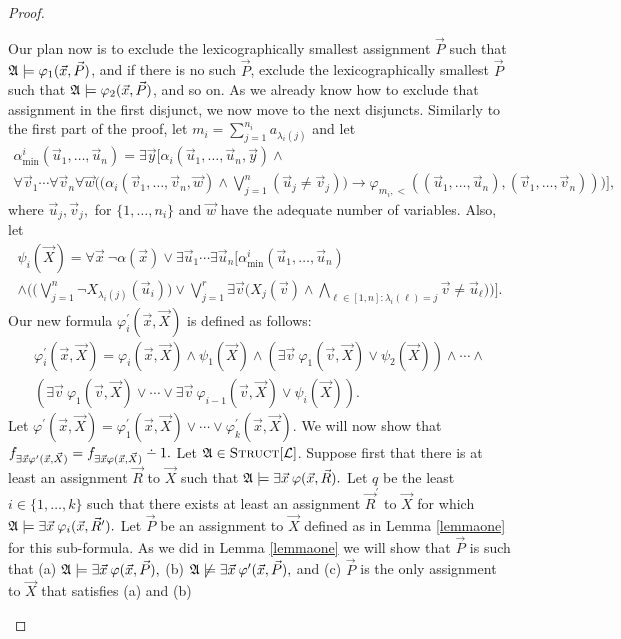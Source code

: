 \documentclass[12pt]{article}
\def\dotminus{\mathbin{\ooalign{\hss\raise1ex\hbox{.}\hss\cr
  \mathsurround=0pt$-$}}}
\def\Truc{\textsc{Struct}[\L]}
\def\A{{\frak A}}
\def\L{{\cal L}}
\def\P{\vec{P}}
\def\R{\vec{R}}
\def\X{\vec{X}}
\def\u{\vec{u}} %
\def\v{\vec{v}} %
\def\w{\vec{w}} %
\def\x{\vec{x}} %
\def\y{\vec{y}} %
\begin{document}
\begin{proof}
\begin{enumerate}
Our plan now is to exclude the lexicographically smallest assignment $\P$ such that $\A\models\varphi_1(\x,\P)$, and if there is no such $\P$, exclude the lexicographically smallest $\P$ such that $\A\models\varphi_2(\x,\P)$, and so on. As we already know how to exclude that assignment in the first disjunct, we now move to the next disjuncts. Similarly to the first part of the proof, let $m_i = \sum_{j = 1}^{n_i} a_{\lambda_i(j)}$ and let
\begin{multline*}
\alpha^i_{\min}(\u_1,\dots,\u_n) = \exists\y\Big[ \alpha_i(\u_1,\dots,\u_n,\y)\wedge \\ \forall\v_1\cdots\forall\v_n\forall\w\Big(\big(\alpha_i(\v_1,\dots,\v_n,\w)\wedge\bigvee_{j=1}^n(\u_j\neq\v_j)\big)\to \varphi_{m_i,<}((\u_1,\dots,\u_n),(\v_1,\dots,\v_n))\Big)\Big],
\end{multline*}
where $\u_j,\v_j,$ for $\{1,\ldots,n_i\}$ and $\w$ have the adequate number of variables. Also, let
\begin{multline*}
\psi_i(\X) = \forall\x\:\neg\alpha(\x) \vee \exists\u_1\cdots\exists\u_n\bigg[\alpha^i_{\min}(\u_1,\dots,\u_n) \\ \wedge \bigg(\bigg(\bigvee_{j = 1}^{n}\neg X_{\lambda_i(j)}(\u_i) \bigg) \vee \bigvee_{j=1}^r \exists \v\Big( X_j(\v) \wedge \bigwedge_{\ell\in[1,n]: \lambda_i(\ell) = j} \v \neq \u_\ell\Big) \bigg) \bigg].
\end{multline*}
Our new formula $\varphi_i^\prime(\x,\X)$ is defined as follows:
\begin{multline}
\varphi_i^\prime(\x,\X) = \varphi_i(\x,\X) \wedge \psi_1(\X) \wedge (\exists\v\:\varphi_1(\v,\X)\vee\psi_2(\X)) \wedge \cdots \wedge \\ (\exists\v\:\varphi_1(\v,\X)\vee\cdots\vee\exists\v\:\varphi_{i-1}(\v,\X)\vee\psi_i(\X)).
\end{multline}
Let $\varphi^\prime(\x,\X) = \varphi_1^\prime(\x,\X)\vee\cdots\vee\varphi_k^\prime(\x,\X).$ We will now show that $f_{\exists\x\varphi^\prime(\x,\X)} = f_{\exists\x\varphi(\x,\X)}\dotminus 1.$ Let $\A\in\Truc$. Suppose first that there is at least an assignment $\R$ to $\X$ such that $\A\models\exists\x\:\varphi(\x,\R).$ Let $q$ be the least $i\in\{1,\ldots,k\}$ such that there exists at least an assignment $\R^\prime$ to $\X$ for which $\A\models\exists\x\:\varphi_i(\x,\R^\prime).$ Let $\P$ be an assignment to $\X$ defined as in Lemma \ref{lemmaone} for this sub-formula. As we did in Lemma \ref{lemmaone} we will show that $\P$ is such that (a) $\A\models\exists\x\:\varphi(\x,\P),$ (b) $\A\not\models\exists\x\:\varphi^\prime(\x,\P),$ and (c) $\P$ is the only assignment to $\X$ that satisfies (a) and (b)

\end{enumerate}
\end{proof}
\end{document}
